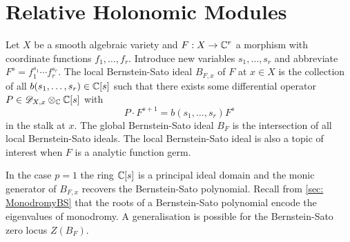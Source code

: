 \chapter{Relative Holonomic Modules}\label{ch: ChapterRelHol}
Let $X$ be a smooth algebraic variety and $F:X\to \mathbb{C}^r$ a morphism with coordinate functions $f_1,\ldots, f_r$.
Introduce new variables $s_1,\ldots, s_r$ and abbreviate $F^s = f_1^{s_1}\cdots f_r^{s_r}$.
The local Bernstein-Sato ideal $B_{F,x}$ of $F$ at $x\in X$ is the collection of all $b(s_1,\ldots,s_r)\in \mathbb{C}[s]$ such that there exists some differential operator $P\in \mathscr{D}_{X,x}\otimes_{\mathbb{C}}\mathbb{C}[s]$ with
$$P\cdot F^{s + 1} =  b(s_1,\ldots,s_r) F^s$$
in the stalk at $x$.
The global Bernstein-Sato ideal $B_F$ is the intersection of all local Bernstein-Sato ideals.
The local Bernstein-Sato ideal is also a topic of interest when $F$ is a analytic function germ.

In the case $p=1$ the ring $\mathbb{C}[s]$ is a principal ideal domain and the monic generator of $B_{F,x}$ recovers the Bernstein-Sato polynomial.
Recall from \cref{sec: MonodromyBS} that the roots of a Bernstein-Sato polynomial encode the eigenvalues of monodromy.
A generalisation is possible for the Bernstein-Sato zero locus $Z(B_F)$.

